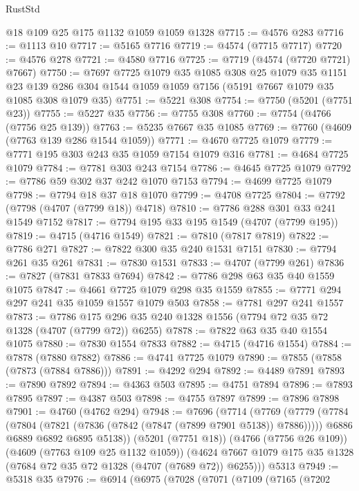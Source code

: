 \begin{lexlean}{RustStd}
\begin{coremodule}
    @18
    @109
    @25
    @175
    @1132
    @1059
    @1059
    @1328
@7715 := @4576 @283
@7716 := @1113 @10
@7717 := @5165 @7716
@7719 := @4574 (@7715 @7717)
@7720 := @4576 @278
@7721 := @4580 @7716
@7725 := @7719 (@4574 (@7720 @7721) @7667)
@7750 := @7697
    @7725
    @1079
    @35
    @1085
    @308
    @25
    @1079
    @35
    @1151
    @23
    @139
    @286
    @304
    @1544
    @1059
    @1059
    @7156
    (@5191 @7667 @1079 @35 @1085 @308 @1079 @35)
@7751 := @5221 @308
@7754 := @7750 (@5201 (@7751 @23))
@7755 := @5227 @35
@7756 := @7755 @308
@7760 := @7754 (@4766 (@7756 @25 @139))
@7763 := @5235 @7667 @35 @1085
@7769 := @7760 (@4609 (@7763 @139 @286 @1544 @1059))
@7771 := @4670 @7725 @1079
@7779 := @7771 @195 @303 @243 @35 @1059 @7154 @1079 @316
@7781 := @4684 @7725 @1079
@7784 := @7781 @303 @243 @7154
@7786 := @4645 @7725 @1079
@7792 := @7786 @59 @302 @37 @242 @1070 @7153
@7794 := @4699 @7725 @1079
@7798 := @7794 @18 @37 @18 @1070
@7799 := @4708 @7725
@7804 := @7792 (@7798 (@4707 (@7799 @18)) @4718)
@7810 := @7786 @288 @301 @33 @241 @1549 @7152
@7817 := @7794 @195 @33 @195 @1549 (@4707 (@7799 @195))
@7819 := @4715 (@4716 @1549)
@7821 := @7810 (@7817 @7819)
@7822 := @7786 @271
@7827 := @7822 @300 @35 @240 @1531 @7151
@7830 := @7794 @261 @35 @261
@7831 := @7830 @1531
@7833 := @4707 (@7799 @261)
@7836 := @7827 (@7831 @7833 @7694)
@7842 := @7786 @298 @63 @35 @40 @1559 @1075
@7847 := @4661 @7725 @1079 @298 @35 @1559
@7855 := @7771 @294 @297 @241 @35 @1059 @1557 @1079 @503
@7858 := @7781 @297 @241 @1557
@7873 := @7786 @175 @296 @35 @240 @1328 @1556 (@7794 @72 @35 @72 @1328 (@4707 (@7799 @72)) @6255)
@7878 := @7822 @63 @35 @40 @1554 @1075
@7880 := @7830 @1554 @7833
@7882 := @4715 (@4716 @1554)
@7884 := @7878 (@7880 @7882)
@7886 := @4741 @7725 @1079
@7890 := @7855 (@7858 (@7873 (@7884 @7886)))
@7891 := @4292 @294
@7892 := @4489 @7891
@7893 := @7890 @7892
@7894 := @4363 @503
@7895 := @4751 @7894
@7896 := @7893 @7895
@7897 := @4387 @503
@7898 := @4755 @7897
@7899 := @7896 @7898
@7901 := @4760 (@4762 @294)
@7948 := @7696
    (@7714
      (@7769
        (@7779
          (@7784 (@7804 (@7821 (@7836 (@7842 (@7847 (@7899 @7901 @5138)) @7886)))))
          @6886
          @6889
          @6892
          @6895
          @5138))
      (@5201 (@7751 @18))
      (@4766 (@7756 @26 @109))
      (@4609 (@7763 @109 @25 @1132 @1059))
      (@4624 @7667 @1079 @175 @35 @1328 (@7684 @72 @35 @72 @1328 (@4707 (@7689 @72)) @6255)))
    @5313
@7949 := @5318 @35
@7976 := @6914
    (@6975
      (@7028
        (@7071
          (@7109
            (@7165
              (@7202

\end{coremodule}
\end{lexlean}
